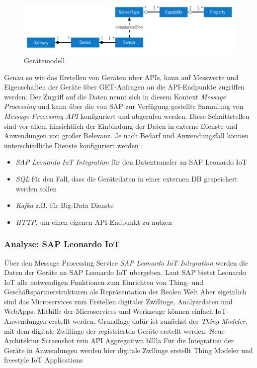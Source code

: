 \begin{figure}[ht!]
  \centering
  \includegraphics[width=1.0\linewidth]{pictures/device_model}
  \caption[Gerätemodell]{Gerätemodell}
  \label{fig:devicemodel}
\end{figure}

\noindent Genau so wie das Erstellen von Geräten über APIs, kann auf Messwerte und Eigenschaften der Geräte über GET-Anfragen an die API-Endpunkte zugriffen werden. Der Zugriff auf die Daten nennt sich in diesem  Kontext \textit{Message Processing} und kann über die von SAP zur Verfügung gestellte Sammlung von \textit{Message Processing API} konfiguriert und abgerufen werden. Diese Schnittstellen sind vor allem hinsichtlich der Einbindung der Daten in externe Dienste und Anwendungen von großer Relevanz. Je nach Bedarf und Anwendungsfall können unterschiedliche Dienste konfiguriert werden \citep{SAP2020}:
\begin{itemize}
  \item \textit{SAP Leonardo IoT Integration} für den Datentransfer an SAP Leonardo IoT
  \item \textit{SQL} für den Fall, dass die Gerätedaten in einer externen DB gespeichert werden sollen
  \item \textit{Kafka} z.B. für Big-Data Dienste
  \item \textit{HTTP}, um einen eigenen API-Endpunkt zu nutzen
\end{itemize}

\subsubsection{Analyse: SAP Leonardo IoT}

Über den Message Processing Service \textit{SAP Leonardo IoT Integration} werden die Daten der Geräte an SAP Leonardo IoT übergeben. Laut SAP bietet Leonardo IoT \glqq alle notwendigen Funktionen zum Einrichten von Thing- und Geschäftspartnerstrukturen als Repräsentation der Realen Welt\grqq{} \citep[S. 11]{SAP2019} Aber eigetnlich sind das Microservices zum Erstellen digitaler Zwillinge, Analysedaten und WebApps. Mithilfe der Microservices und Werkzeuge können einfach IoT-Anwendungen erstellt werden. Grundlage dafür ist zunächst der \textit{Thing Modeler}, mit dem digitale Zwillinge der registrierten Geräte erstellt werden.
Neue Architektur Screenshot rein
API Aggregatiwn blllla
Für die Integration der Geräte in Anwendungen werden hier digitale Zwllinge erstellt
Thing Modeler und freestyle IoT Applications

